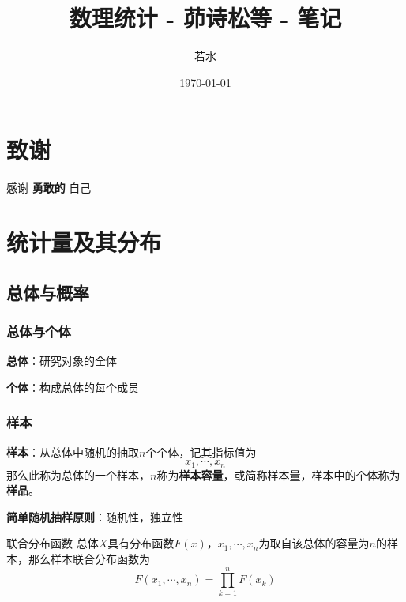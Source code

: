 \documentclass[lang = cn, scheme = chinese, thmcnt = section]{elegantbook}
\title{数理统计 - 茆诗松等 - 笔记}                %
\author{若水}                        %
\date{\today}                       %
\begin{document}
	
\maketitle       %

\frontmatter     %

\chapter*{致谢}


\vspace*{\fill}
	\begin{center}
		
		\large{感谢 \textbf{ 勇敢的 } 自己}
		
	\end{center}
\vspace*{\fill}

\tableofcontents %

\mainmatter      %

\chapter{统计量及其分布}

\section{总体与概率}

\subsection{总体与个体}

\textbf{总体}：研究对象的全体

\textbf{个体}：构成总体的每个成员

\subsection{样本}

\textbf{样本}：从总体中随机的抽取$n$个个体，记其指标值为
$$
x_1,\cdots,x_n
$$
那么此称为总体的一个样本，$n$称为\textbf{样本容量}，或简称样本量，样本中的个体称为\textbf{样品}。

\textbf{简单随机抽样原则}：随机性，独立性

\begin{definition}{联合分布函数}
	总体$X$具有分布函数$F(x)$，$x_1,\cdots,x_n$为取自该总体的容量为$n$的样本，那么样本联合分布函数为
	$$
	F(x_1,\cdots,x_n)=\prod_{k=1}^{n}{F(x_k)}
	$$
\end{definition}
\end{document}
